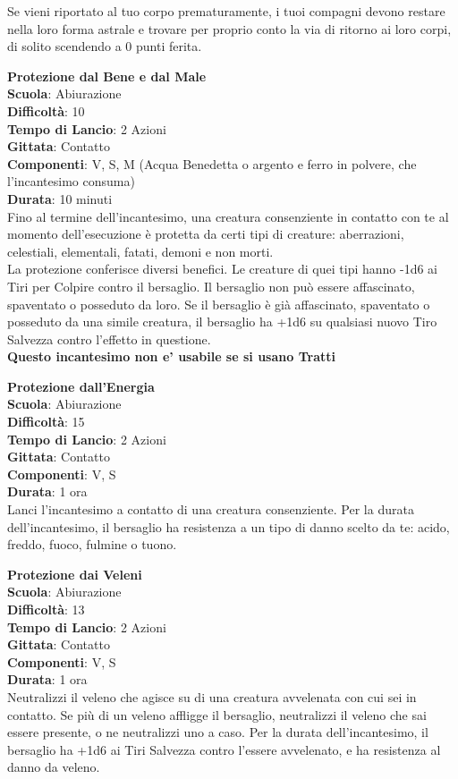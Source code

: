 \begin{multicols}{2}
Se vieni riportato al tuo corpo prematuramente, i tuoi compagni devono restare nella loro forma astrale e trovare per proprio conto la via di ritorno ai loro corpi, di solito scendendo a 0 punti ferita.

\medskip\textbf{Protezione dal Bene e dal Male}\\
\textbf{Scuola}: Abiurazione\\
\textbf{Difficoltà}:  10\\
\textbf{Tempo di Lancio}: 2 Azioni\\
\textbf{Gittata}: Contatto\\
\textbf{Componenti}: V, S, M (Acqua Benedetta o argento e ferro in polvere, che l'incantesimo consuma)\\
\textbf{Durata}: 10 minuti\\
Fino al termine dell'incantesimo, una creatura consenziente in contatto con te al momento dell'esecuzione è protetta da certi tipi di creature: aberrazioni, celestiali, elementali, fatati, demoni e non morti.\\
La protezione conferisce diversi benefici. Le creature di quei tipi hanno -1d6 ai Tiri per Colpire contro il bersaglio. Il bersaglio non può essere affascinato, spaventato o posseduto da loro. Se il bersaglio è già affascinato, spaventato o posseduto da una simile creatura, il bersaglio ha +1d6 su qualsiasi nuovo Tiro Salvezza contro l’effetto in questione.\\
\textbf{Questo incantesimo non e' usabile se si usano  Tratti}

\medskip\textbf{Protezione dall'Energia}\\
\textbf{Scuola}: Abiurazione\\
\textbf{Difficoltà}:  15\\
\textbf{Tempo di Lancio}: 2 Azioni\\
\textbf{Gittata}: Contatto\\
\textbf{Componenti}: V, S\\
\textbf{Durata}: 1 ora\\
Lanci l'incantesimo a contatto di una creatura consenziente. Per la durata dell'incantesimo, il bersaglio ha resistenza a un tipo di danno scelto da te: acido, freddo, fuoco, fulmine o tuono.

\medskip\textbf{Protezione dai Veleni}\\
\textbf{Scuola}: Abiurazione\\
\textbf{Difficoltà}:  13\\
\textbf{Tempo di Lancio}: 2 Azioni\\
\textbf{Gittata}: Contatto\\
\textbf{Componenti}: V, S\\
\textbf{Durata}: 1 ora\\
Neutralizzi il veleno che agisce su di una creatura avvelenata con cui sei in contatto. Se più di un veleno affligge il bersaglio, neutralizzi il veleno che sai essere presente, o ne neutralizzi uno a caso. Per la durata dell'incantesimo, il bersaglio ha +1d6 ai Tiri Salvezza contro l’essere avvelenato, e ha resistenza al danno da veleno.


\end{multicols}
